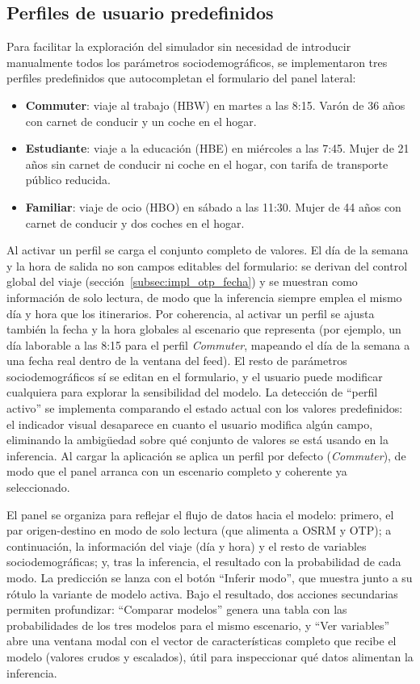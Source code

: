 \subsection{Perfiles de usuario predefinidos}
\label{subsec:impl_frontend_perfiles}

Para facilitar la exploración del simulador sin necesidad de introducir manualmente todos los parámetros sociodemográficos, se implementaron tres perfiles predefinidos que autocompletan el formulario del panel lateral:

\begin{itemize}
  \item \textbf{Commuter}: viaje al trabajo (HBW) en martes a las 8:15. Varón de 36 años con carnet de conducir y un coche en el hogar.
  \item \textbf{Estudiante}: viaje a la educación (HBE) en miércoles a las 7:45. Mujer de 21 años sin carnet de conducir ni coche en el hogar, con tarifa de transporte público reducida.
  \item \textbf{Familiar}: viaje de ocio (HBO) en sábado a las 11:30. Mujer de 44 años con carnet de conducir y dos coches en el hogar.
\end{itemize}

Al activar un perfil se carga el conjunto completo de valores. El día de la semana y la hora de salida no son campos editables del formulario: se derivan del control global del viaje (sección~\ref{subsec:impl_otp_fecha}) y se muestran como información de solo lectura, de modo que la inferencia siempre emplea el mismo día y hora que los itinerarios. Por coherencia, al activar un perfil se ajusta también la fecha y la hora globales al escenario que representa (por ejemplo, un día laborable a las 8:15 para el perfil \textit{Commuter}, mapeando el día de la semana a una fecha real dentro de la ventana del feed). El resto de parámetros sociodemográficos sí se editan en el formulario, y el usuario puede modificar cualquiera para explorar la sensibilidad del modelo. La detección de ``perfil activo'' se implementa comparando el estado actual con los valores predefinidos: el indicador visual desaparece en cuanto el usuario modifica algún campo, eliminando la ambigüedad sobre qué conjunto de valores se está usando en la inferencia. Al cargar la aplicación se aplica un perfil por defecto (\textit{Commuter}), de modo que el panel arranca con un escenario completo y coherente ya seleccionado.

El panel se organiza para reflejar el flujo de datos hacia el modelo: primero, el par origen-destino en modo de solo lectura (que alimenta a OSRM y OTP); a continuación, la información del viaje (día y hora) y el resto de variables sociodemográficas; y, tras la inferencia, el resultado con la probabilidad de cada modo. La predicción se lanza con el botón ``Inferir modo'', que muestra junto a su rótulo la variante de modelo activa. Bajo el resultado, dos acciones secundarias permiten profundizar: ``Comparar modelos'' genera una tabla con las probabilidades de los tres modelos para el mismo escenario, y ``Ver variables'' abre una ventana modal con el vector de características completo que recibe el modelo (valores crudos y escalados), útil para inspeccionar qué datos alimentan la inferencia.

